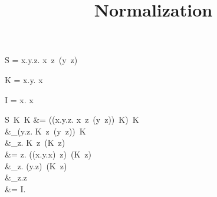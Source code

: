 \documentclass{article}
\title{Normalization}
\begin{document}
\maketitle

S = \lambda x.\lambda y.\lambda z. x\ z\ (y\ z)

K = \lambda x.\lambda y. x

I = \lambda x. x

S\ K\ K
&= ((\lambda x.\lambda y.\lambda z. x\ z\ (y\ z))\ K)\ K \\

&\to_\beta (\lambda y.\lambda z. K\ z\ (y\ z))\ K \\

&\to_\beta \lambda z. K\ z\ (K\ z) \\

&= \lambda z. ((\lambda x.\lambda y.x)\ z)\ (K\ z) \\

&\to_\beta \lambda z. (\lambda y.z)\ (K\ z) \\

&\to_\beta \lambda z.z \\

&= I.
\end{document}
